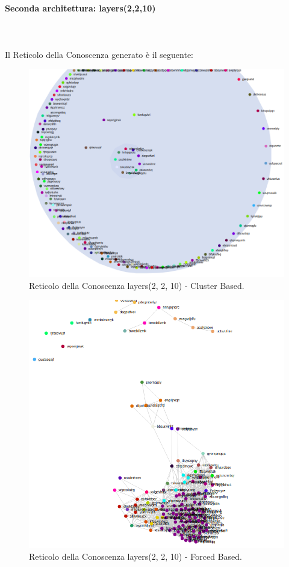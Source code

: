 \paragraph{Seconda architettura: layers(2,2,10)}\mbox{}\\\\
\label{Seconda architettura}
\noindent
Il Reticolo della Conoscenza generato è il seguente:
\begin{figure}[H]
\centering
	\includegraphics[width=0.70\linewidth]{./image/sql(2,2,10).png}
	\caption{Reticolo della Conoscenza layers(2, 2, 10) - Cluster Based.}
	\label{Reticolo della Conoscenza layers(2, 2, 10) - Cluster Based.}
\end{figure}
\noindent

\begin{figure}[H]
\centering
	\includegraphics[width=0.70\linewidth]{./image/sql(2,2,10)_forced.png}
	\caption{Reticolo della Conoscenza layers(2, 2, 10) - Forced Based.}
	\label{Reticolo della Conoscenza layers(2, 2, 10) - Forced Based.}
\end{figure}
\noindent

